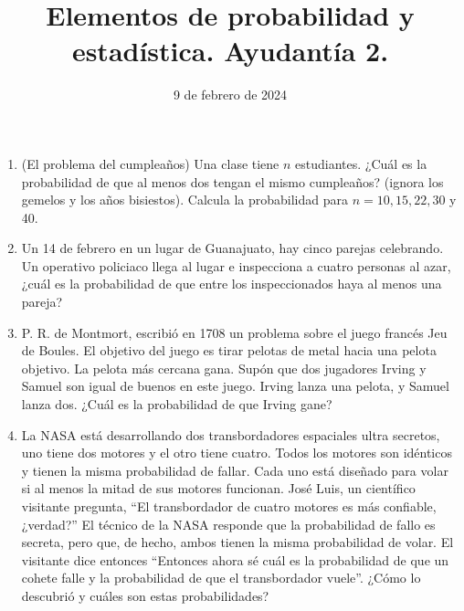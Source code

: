 \documentclass{article}
\title{Elementos de probabilidad y estadística. Ayudantía 2.}
\date{9 de febrero de 2024}
\begin{document}
\maketitle


\begin{enumerate}
    \item (El problema del cumpleaños) Una clase tiene $n$ estudiantes. ¿Cuál es la
    probabilidad de que al menos dos tengan el mismo cumpleaños? (ignora los gemelos
    y los años bisiestos). Calcula la probabilidad para $n=10,15,22,30$ y 40.

    \item Un 14 de febrero en un lugar de Guanajuato, hay cinco parejas celebrando.
    Un operativo policiaco llega al lugar e inspecciona a cuatro personas al azar,
    ¿cuál es la probabilidad de que entre los inspeccionados haya al menos una pareja?

    \item P. R. de Montmort, escribió en 1708 un problema sobre el juego francés
    Jeu de Boules.  El objetivo del juego es  tirar pelotas de metal hacia una pelota 
    objetivo.  La pelota más cercana gana.  Supón que dos jugadores Irving y Samuel son igual
    de buenos en este juego. Irving lanza una pelota, y Samuel lanza dos. ¿Cuál es la
    probabilidad de que Irving gane?

    \item La NASA está desarrollando dos transbordadores espaciales ultra secretos,
    uno tiene dos motores y el otro tiene cuatro.  Todos los motores son idénticos 
    y tienen la misma probabilidad de fallar.  Cada uno está diseñado para volar si 
    al menos la mitad de sus motores funcionan.  José Luis, un científico visitante pregunta,
    ``El transbordador de cuatro motores es más confiable, ¿verdad?'' El técnico de
    la NASA responde que la probabilidad de fallo es secreta, pero que, de hecho, 
    ambos tienen la misma probabilidad de volar. El visitante dice entonces ``Entonces
    ahora sé cuál es la probabilidad de que un cohete falle y la probabilidad de que
    el transbordador vuele''. ¿Cómo lo descubrió y cuáles son estas probabilidades?
    

\end{enumerate}
\end{document}
